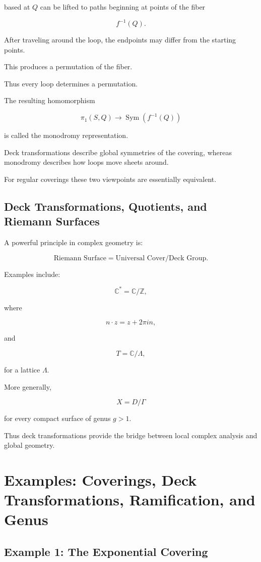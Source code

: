 \documentclass[12pt,a4paper]{article}
\theoremstyle{notespace}
\begin{document}
based at \(Q\) can be lifted to paths beginning at points of the fiber

\[
f^{-1}(Q).
\]

After traveling around the loop, the endpoints may differ from the starting points.

This produces a permutation of the fiber.

Thus every loop determines a permutation.

The resulting homomorphism

\[
\pi_1(S,Q)
\to
\operatorname{Sym}(f^{-1}(Q))
\]

is called the monodromy representation.

Deck transformations describe global symmetries of the covering, whereas monodromy describes how loops move sheets around.

For regular coverings these two viewpoints are essentially equivalent.

\subsection{Deck Transformations, Quotients, and Riemann Surfaces}

A powerful principle in complex geometry is:

\[
\text{Riemann Surface}
=
\text{Universal Cover}
/
\text{Deck Group}.
\]

Examples include:

\[
\mathbb C^*
=
\mathbb C/\mathbb Z,
\]

where

\[
n\cdot z=z+2\pi i n,
\]

and

\[
T=\mathbb C/\Lambda,
\]

for a lattice \(\Lambda\).

More generally,

\[
X=D/\Gamma
\]

for every compact surface of genus \(g>1\).

Thus deck transformations provide the bridge between local complex analysis and global geometry.

\section{Examples: Coverings, Deck Transformations, Ramification, and Genus}

\subsection{Example 1: The Exponential Covering}
\end{document}
